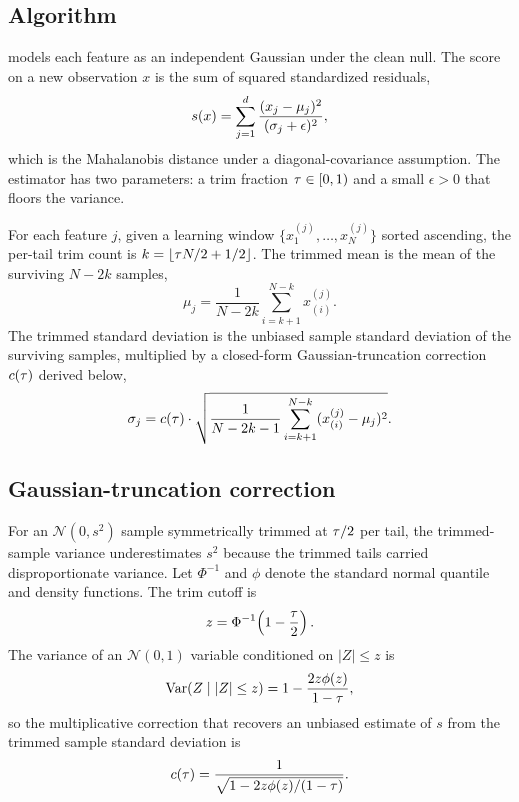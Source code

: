 \section{\sediment{}}
\label{sec:sediment}

\subsection{Algorithm}

\sediment{} models each feature as an independent Gaussian under the
clean null. The score on a new observation $x$ is the sum of squared
standardized residuals,
\begin{equation}
  s(x) = \sum_{j=1}^{d} \frac{(x_j - \mu_j)^2}{(\sigma_j + \epsilon)^2},
  \label{eq:score}
\end{equation}
which is the Mahalanobis distance under a diagonal-covariance
assumption. The estimator has two parameters: a trim fraction
$\tau \in [0, 1)$ and a small $\epsilon > 0$ that floors the
variance.

For each feature $j$, given a learning window
$\{x_1^{(j)}, \dots, x_N^{(j)}\}$ sorted ascending, the per-tail
trim count is $k = \lfloor \tau N / 2 + 1/2 \rfloor$. The trimmed
mean is the mean of the surviving $N - 2k$ samples,
\begin{equation}
  \mu_j = \frac{1}{N - 2k} \sum_{i=k+1}^{N-k} x_{(i)}^{(j)}.
\end{equation}
The trimmed standard deviation is the unbiased sample standard
deviation of the surviving samples, multiplied by a closed-form
Gaussian-truncation correction $c(\tau)$ derived below,
\begin{equation}
  \sigma_j = c(\tau) \cdot \sqrt{\frac{1}{N - 2k - 1}
                       \sum_{i=k+1}^{N-k} (x_{(i)}^{(j)} - \mu_j)^2}.
\end{equation}

\subsection{Gaussian-truncation correction}

For an $\mathcal{N}(0, s^2)$ sample symmetrically trimmed at
$\tau/2$ per tail, the trimmed-sample variance underestimates $s^2$
because the trimmed tails carried disproportionate variance. Let
$\Phi^{-1}$ and $\phi$ denote the standard normal quantile and
density functions. The trim cutoff is
\begin{equation}
  z = \Phi^{-1}\!\left(1 - \frac{\tau}{2}\right).
\end{equation}
The variance of an $\mathcal{N}(0, 1)$ variable conditioned on
$|Z| \leq z$ is
\begin{equation}
  \mathrm{Var}(Z \mid |Z| \leq z) = 1 - \frac{2 z \phi(z)}{1 - \tau},
  \label{eq:truncated-variance}
\end{equation}
so the multiplicative correction that recovers an unbiased estimate
of $s$ from the trimmed sample standard deviation is
\begin{equation}
  c(\tau) = \frac{1}{\sqrt{1 - 2 z \phi(z) / (1 - \tau)}}.
\end{equation}


